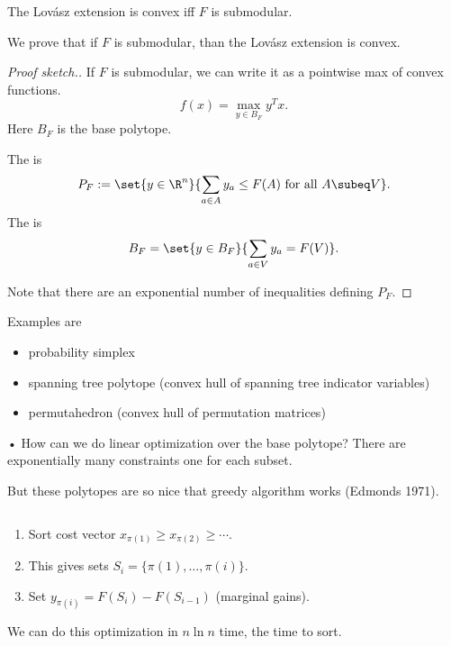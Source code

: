\begin{thm}
The Lov\'asz extension is convex iff $F$ is submodular.
\end{thm}
We prove that if $F$ is submodular, than the Lov\'asz extension is convex. %
\begin{proof}[Proof sketch.]
If $F$ is submodular, we can write it as a pointwise max of convex functions.
$$ f(x) = \max_{y\in B_F} y^Tx.$$
Here
$B_F$ is the base polytope. 
\begin{df}
 The  is
$$
P_F := \set{y\in \R^n}{\sum_{a\in A} y_a\le F(A)\text{ for all }A\subeq V}.
$$
The  is
$$
B_F = \set{y\in B_F}{\sum_{a\in V}y_a=F(V)}.
$$
\end{df}
Note that there are an exponential number of inequalities defining $P_F$.
\end{proof}
Examples are 
\begin{itemize}
\item
probability simplex
\item
spanning tree polytope (convex hull of spanning tree indicator variables)
\item
permutahedron 
(convex hull of permutation matrices)
\end{itemize}•
How can we do linear optimization over the base polytope? There are exponentially many constraints one for each subset.

But these polytopes are so nice that greedy algorithm works (Edmonds 1971). 
\begin{alg}
$\,$
\begin{enumerate}
\item
Sort cost vector $x_{\pi(1)}\ge x_{\pi(2)}\ge \cdots$.
\item
This gives sets $S_i=\{\pi(1),\ldots, \pi(i)\}$.
\item
Set $y_{\pi(i)} = F(S_i)-F(S_{i-1})$ (marginal gains).
\end{enumerate}
\end{alg}
We can do this optimization in $n\ln n$ time, the time to sort.

